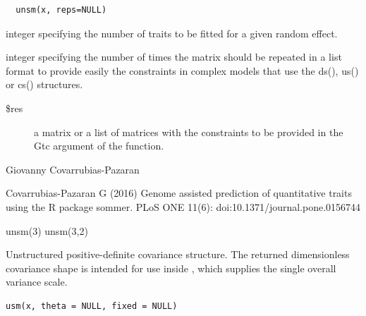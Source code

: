 \documentclass[a4paper]{book}
\begin{document}
%
\begin{Usage}
\begin{verbatim}
  unsm(x, reps=NULL)
\end{verbatim}
\end{Usage}
%
\begin{Arguments}
\begin{ldescription}
\item[\code{x}] integer specifying the number of traits to be fitted for a given random effect.
\item[\code{reps}] integer specifying the number of times the matrix should be repeated in a list format to provide easily the constraints in complex models that use the ds(), us() or cs() structures.
\end{ldescription}
\end{Arguments}
%
\begin{Value}
\begin{description}


\item[\$res]  a matrix or a list of matrices with the constraints to be provided in the Gtc argument of the  function.

\end{description}

\end{Value}
%
\begin{Author}\relax
Giovanny Covarrubias-Pazaran
\end{Author}
%
\begin{References}\relax
Covarrubias-Pazaran G (2016) Genome assisted prediction of quantitative traits using the R package sommer. PLoS ONE 11(6): doi:10.1371/journal.pone.0156744 
\end{References}
%
\begin{Examples}
\begin{ExampleCode}
unsm(3)
unsm(3,2)
\end{ExampleCode}
\end{Examples}
%
\begin{Description}\relax
Unstructured positive-definite covariance structure. The returned dimensionless covariance shape is intended for use inside , which supplies the single overall variance scale.
\end{Description}
%
\begin{Usage}
\begin{verbatim}
usm(x, theta = NULL, fixed = NULL)
\end{verbatim}
\end{Usage}
\end{document}
